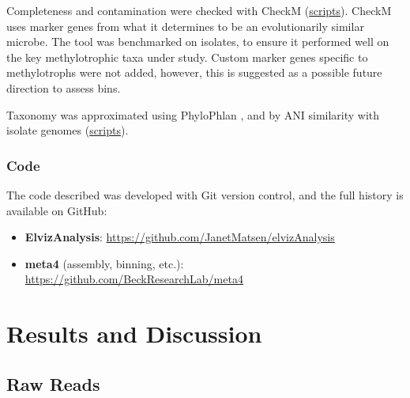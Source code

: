 Completeness and contamination were checked with CheckM \cite{parks2015} (\href{https://github.com/BeckResearchLab/meta4/tree/master/m4b_binning/assembly/bin_info}{scripts}).
CheckM uses marker genes from what it determines to be an evolutionarily similar microbe.
The tool was benchmarked on isolates, to ensure it performed well on the key methylotrophic taxa under study.
Custom marker genes specific to methylotrophs were not added, however, this is suggested as a possible future direction to assess bins.

Taxonomy was approximated using PhyloPhlan \cite{segata2013}, and by ANI similarity with isolate genomes (\href{https://github.com/BeckResearchLab/meta4/tree/master/m4b_binning/assembly/bin_info}{scripts}).

\subsubsection{Code}    %
The code described was developed with Git version control, and the full history is available on GitHub:
\begin{itemize}
    \item \textbf{ElvizAnalysis}: \url{https://github.com/JanetMatsen/elvizAnalysis}
    \item \textbf{meta4} (assembly, binning, etc.): \url{https://github.com/BeckResearchLab/meta4}
\end{itemize}

\section{Results and Discussion}


\subsection{Raw Reads}

